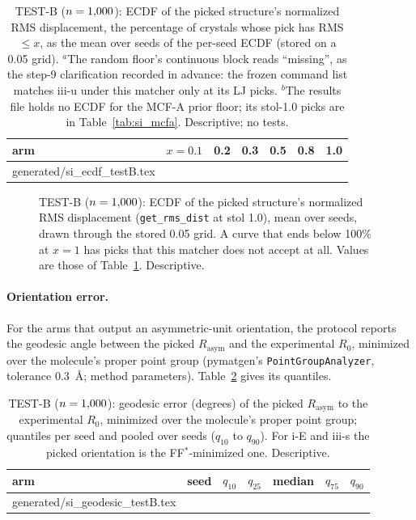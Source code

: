\documentclass[journal=acsodf,manuscript=article]{achemso}
\makeatletter
\newcommand{\inputrows}[1]{\@@input #1 }
\makeatother
\begin{document}
\begin{table}[htbp]
\caption{TEST-B ($n=1{,}000$): ECDF of the picked structure's normalized RMS displacement, the
percentage of crystals whose pick has RMS $\le x$, as the mean over seeds of the per-seed ECDF
(stored on a 0.05 grid). $^{a}$The random floor's continuous block reads ``missing'', as the
step-9 clarification recorded in advance: the frozen command list matches iii-u under this
matcher only at its LJ picks. $^{b}$The results file holds no ECDF for the MCF-A prior floor;
its stol-1.0 picks are in Table~\ref{tab:si_mcfa}. Descriptive; no tests.}
\label{tab:si_ecdf}
\centering
\footnotesize
\begin{tabular}{@{}lcccccc@{}}
\toprule
arm & $x=0.1$ & 0.2 & 0.3 & 0.5 & 0.8 & 1.0 \\
\midrule
\inputrows{generated/si_ecdf_testB.tex}
\bottomrule
\end{tabular}
\end{table}

\begin{figure}[htbp]
\centering

\caption{TEST-B ($n=1{,}000$): ECDF of the picked structure's normalized RMS displacement
(\texttt{get\_rms\_dist} at stol 1.0), mean over seeds, drawn through the stored 0.05 grid. A
curve that ends below 100\% at $x=1$ has picks that this matcher does not accept at all.
Values are those of Table~\ref{tab:si_ecdf}. Descriptive.}
\label{fig:si_ecdf}
\end{figure}

\paragraph{Orientation error.} For the arms that output an asymmetric-unit orientation, the
protocol reports the geodesic angle between the picked $R_{\text{asym}}$ and the experimental
$R_0$, minimized over the molecule's proper point group (pymatgen's
\texttt{PointGroupAnalyzer}, tolerance 0.3~\AA; method parameters). Table~\ref{tab:si_geodesic}
gives its quantiles.

\begin{table}[htbp]
\caption{TEST-B ($n=1{,}000$): geodesic error (degrees) of the picked $R_{\text{asym}}$ to the
experimental $R_0$, minimized over the molecule's proper point group; quantiles per seed and
pooled over seeds ($q_{10}$ to $q_{90}$). For i-E and iii-s the picked orientation is the
FF$^\ast$-minimized one. Descriptive.}
\label{tab:si_geodesic}
\centering
\small
\begin{tabular}{@{}llccccc@{}}
\toprule
arm & seed & $q_{10}$ & $q_{25}$ & median & $q_{75}$ & $q_{90}$ \\
\midrule
\inputrows{generated/si_geodesic_testB.tex}
\bottomrule
\end{tabular}
\end{table}
\end{document}
